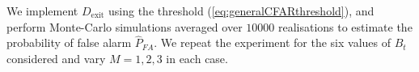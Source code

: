 \documentclass[11pt]{article}
\begin{document}
We implement $D_{\text{exit}}$ using the threshold (\ref{eq:generalCFARthreshold}), and perform Monte-Carlo simulations averaged over $10000$ realisations to estimate the probability of false alarm $\hat{P}_{FA}$. We repeat the experiment for the six values of $B_{t}$ considered and vary $M=1,2,3$ in each case.
\begin{figure}[h!]
\centering
{}

\end{figure}
\end{document}
